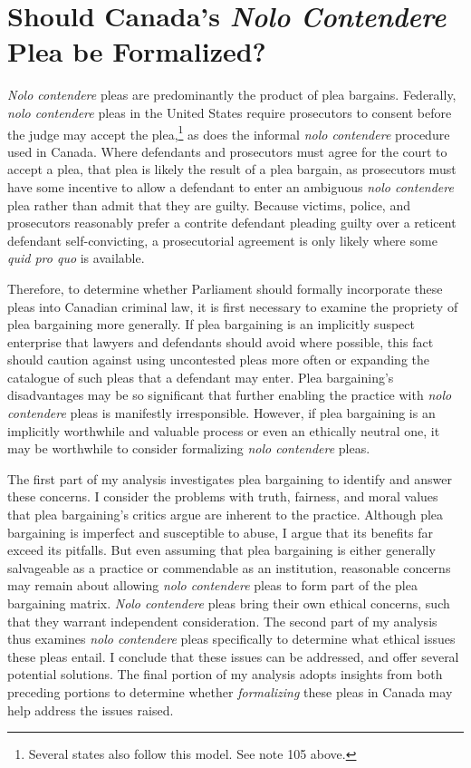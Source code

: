 \chapter{Should Canada's \textit{Nolo Contendere} Plea be Formalized?}

\setcounter{footnote}{174}

\textit{Nolo contendere} pleas are predominantly the product of plea bargains. Federally, \textit{nolo contendere} pleas in the United States require prosecutors to consent before the judge may accept the plea,\footnote{Several states also follow this model. See note 105 above.} as does the informal \textit{nolo contendere} procedure used in Canada. Where defendants and prosecutors must agree for the court to accept a plea, that plea is likely the result of a plea bargain, as prosecutors must have some incentive to allow a defendant to enter an ambiguous \textit{nolo contendere} plea rather than admit that they are guilty. Because victims, police, and prosecutors reasonably prefer a contrite defendant pleading guilty over a reticent defendant self-convicting, a prosecutorial agreement is only likely where some \textit{quid pro quo} is available.

Therefore, to determine whether Parliament should formally incorporate these pleas into Canadian criminal law, it is first necessary to examine the propriety of plea bargaining more generally. If plea bargaining is an implicitly suspect enterprise that lawyers and defendants should avoid where possible, this fact should caution against using uncontested pleas more often or expanding the catalogue of such pleas that a defendant may enter. Plea bargaining's disadvantages may be so significant that further enabling the practice with \textit{nolo contendere} pleas is manifestly irresponsible. However, if plea bargaining is an implicitly worthwhile and valuable process or even an ethically neutral one, it may be worthwhile to consider formalizing \textit{nolo contendere} pleas.

The first part of my analysis investigates plea bargaining to identify and answer these concerns. I consider the problems with truth, fairness, and moral values that plea bargaining's critics argue are inherent to the practice. Although plea bargaining is imperfect and susceptible to abuse, I argue that its benefits far exceed its pitfalls. But even assuming that plea bargaining is either generally salvageable as a practice or commendable as an institution, reasonable concerns may remain about allowing \textit{nolo contendere} pleas to form part of the plea bargaining matrix. \textit{Nolo contendere} pleas bring their own ethical concerns, such that they warrant independent consideration. The second part of my analysis thus examines \textit{nolo contendere} pleas specifically to determine what ethical issues these pleas entail. I conclude that these issues can be addressed, and offer several potential solutions. The final portion of my analysis adopts insights from both preceding portions to determine whether \textit{formalizing} these pleas in Canada may help address the issues raised.